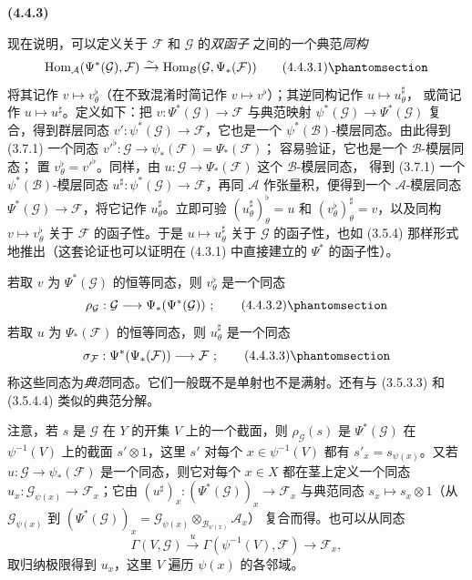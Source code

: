 \documentclass[UTF8,fontset=none,11pt,oneside,openany]{ctexbook}
\newenvironment{env}[1][]{%
  \par\medskip\noindent\textbf{(#1)}\ %
}{\par}
\newcommand{\oldpage}[2][]{%
  \hypertarget{ega-source-page-#1-#2}{}%
  \marginnote{\scriptsize\textbf{#1}~|~#2}\ignorespaces}
\let\EGAOriginalLabel\label
\renewcommand{\label}[1]{\phantomsection\EGAOriginalLabel{#1}}
\begin{document}
\begin{env}[4.4.3]
\label{0.4.4.3-fr}
现在说明，可以定义关于 $\mathcal{F}$ 和 $\mathcal{G}$ 的\emph{双函子}
之间的一个典范\emph{同构}
\[
  \operatorname{Hom}_{\mathcal{A}}(\Psi^*(\mathcal{G}),\mathcal{F})
  \xrightarrow{\sim}
  \operatorname{Hom}_{\mathcal{B}}(\mathcal{G},\Psi_*(\mathcal{F}))
  \tag{4.4.3.1}\label{0.4.4.3.1-fr}
\]
将其记作 $v\mapsto v_\theta^\flat$（在不致混淆时简记作
$v\mapsto v^\flat$）；其逆同构记作 $u\mapsto u_\theta^\sharp$，
或简记作 $u\mapsto u^\sharp$。定义如下：把
$v:\Psi^*(\mathcal{G})\to\mathcal{F}$ 与典范映射
$\psi^*(\mathcal{G})\to\Psi^*(\mathcal{G})$ 复合，得到群层同态
$v':\psi^*(\mathcal{G})\to\mathcal{F}$，它也是一个
$\psi^*(\mathcal{B})$-模层同态。由此得到 (3.7.1) 一个同态
${v'}^\flat:\mathcal{G}\to\psi_*(\mathcal{F})=\Psi_*(\mathcal{F})$；
容易验证，它也是一个 $\mathcal{B}$-模层同态；
\oldpage[0\textsubscript{I}]{43}
置 $v_\theta^\flat={v'}^\flat$。同样，由
$u:\mathcal{G}\to\Psi_*(\mathcal{F})$ 这个 $\mathcal{B}$-模层同态，
得到 (3.7.1) 一个 $\psi^*(\mathcal{B})$-模层同态
$u^\sharp:\psi^*(\mathcal{G})\to\mathcal{F}$，再同
$\mathcal{A}$ 作张量积，便得到一个 $\mathcal{A}$-模层同态
$\Psi^*(\mathcal{G})\to\mathcal{F}$，将它记作
$u_\theta^\sharp$。立即可验
$(u_\theta^\sharp)_\theta^\flat=u$ 和
$(v_\theta^\flat)_\theta^\sharp=v$，以及同构
$v\mapsto v_\theta^\flat$ 关于 $\mathcal{F}$ 的函子性。于是
$u\mapsto u_\theta^\sharp$ 关于 $\mathcal{G}$ 的函子性，也如 (3.5.4)
那样形式地推出（这套论证也可以证明在 (4.3.1) 中直接建立的
$\Psi^*$ 的函子性）。

若取 $v$ 为 $\Psi^*(\mathcal{G})$ 的恒等同态，则
$v_\theta^\flat$ 是一个同态
\[
  \rho_{\mathcal{G}}:\mathcal{G}\longrightarrow
  \Psi_*(\Psi^*(\mathcal{G}))~;
  \tag{4.4.3.2}\label{0.4.4.3.2-fr}
\]
若取 $u$ 为 $\Psi_*(\mathcal{F})$ 的恒等同态，则
$u_\theta^\sharp$ 是一个同态
\[
  \sigma_{\mathcal{F}}:\Psi^*(\Psi_*(\mathcal{F}))
  \longrightarrow\mathcal{F}~;
  \tag{4.4.3.3}\label{0.4.4.3.3-fr}
\]
称这些同态为\emph{典范}同态。它们一般既不是单射也不是满射。还有与
(3.5.3.3) 和 (3.5.4.4) 类似的典范分解。

注意，若 $s$ 是 $\mathcal{G}$ 在 $Y$ 的开集 $V$ 上的一个截面，则
$\rho_{\mathcal{G}}(s)$ 是 $\Psi^*(\mathcal{G})$ 在
$\psi^{-1}(V)$ 上的截面 $s'\otimes1$，这里 $s'$ 对每个
$x\in\psi^{-1}(V)$ 都有 $s'_x=s_{\psi(x)}$。又若
$u:\mathcal{G}\to\psi_*(\mathcal{F})$ 是一个同态，则它对每个
$x\in X$ 都在茎上定义一个同态
$u_x:\mathcal{G}_{\psi(x)}\to\mathcal{F}_x$；它由
$(u^\sharp)_x:(\Psi^*(\mathcal{G}))_x\to\mathcal{F}_x$ 与典范同态
$s_x\mapsto s_x\otimes1$（从 $\mathcal{G}_{\psi(x)}$ 到
$(\Psi^*(\mathcal{G}))_x
=\mathcal{G}_{\psi(x)}\otimes_{\mathcal{B}_{\psi(x)}}\mathcal{A}_x$）
复合而得。也可以从同态
\[
  \Gamma(V,\mathcal{G})\xrightarrow{u}
  \Gamma(\psi^{-1}(V),\mathcal{F})\longrightarrow\mathcal{F}_x,
\]
取归纳极限得到 $u_x$，这里 $V$ 遍历 $\psi(x)$ 的各邻域。
\end{env}
\end{document}
